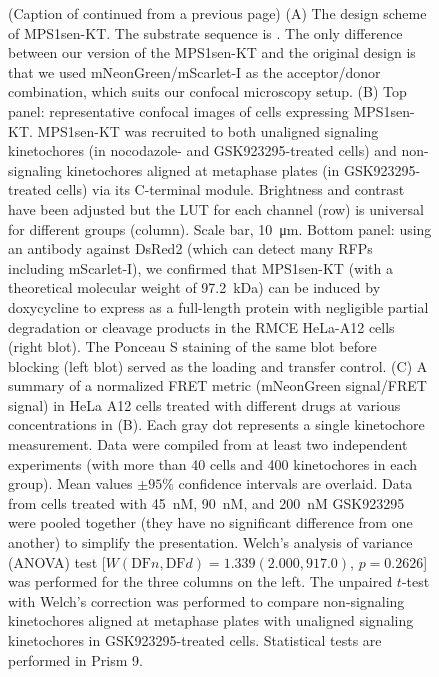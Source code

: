 \begin{figure}
    \noindent\justifying (Caption of  continued from a previous page) (A) The design scheme of MPS1sen-KT. The  substrate sequence is .
    The only difference between our version of the MPS1sen-KT and the original design \cite{MPS1senor} is that we used mNeonGreen/mScarlet-I as the acceptor/donor combination, which suits our confocal microscopy setup. (B) Top panel: representative confocal images of cells expressing MPS1sen-KT. MPS1sen-KT was recruited to both unaligned signaling kinetochores (in nocodazole- and GSK923295-treated cells) and non-signaling kinetochores aligned at metaphase plates (in GSK923295-treated cells) via its C-terminal  module. Brightness and contrast have been adjusted but the LUT for each channel (row) is universal for different groups (column). Scale bar, \SI{10}{\micro m}. Bottom panel: using an antibody against DsRed2 (which can detect many RFPs including mScarlet-I), we confirmed that MPS1sen-KT (with a theoretical molecular weight of \SI{97.2}{kDa}) can be induced by doxycycline to express as a full-length protein with negligible partial degradation or cleavage products in the RMCE HeLa-A12 cells (right blot). The Ponceau S staining of the same blot before blocking (left blot) served as the loading and transfer control. (C) A summary of a normalized FRET metric (mNeonGreen signal/FRET signal) in HeLa A12 cells treated with different drugs at various concentrations in (B). Each gray dot represents a single kinetochore measurement. Data were compiled from at least two independent experiments (with more than 40 cells and 400 kinetochores in each group). Mean values $\pm 95\%$ confidence intervals are overlaid. Data from cells treated with \SI{45}{nM}, \SI{90}{nM}, and \SI{200}{nM} GSK923295 were pooled together (they have no significant difference from one another) to simplify the presentation. Welch's analysis of variance (ANOVA) test [$W(\text{DF}n, \text{DF}d) = 1.339 (2.000, 917.0)$, $p = 0.2626$] was performed for the three columns on the left. The unpaired $t$-test with Welch's correction was performed to compare non-signaling kinetochores aligned at metaphase plates with unaligned signaling kinetochores in GSK923295-treated cells. Statistical tests are performed in Prism 9.
\end{figure}

